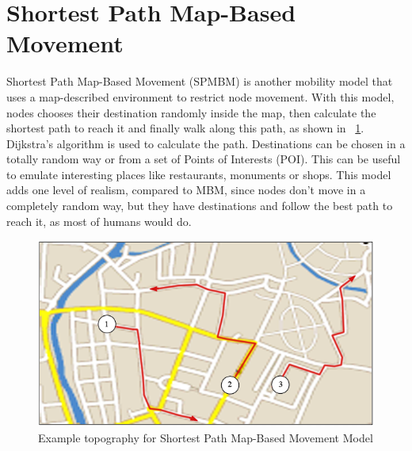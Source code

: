\section{Shortest Path Map-Based Movement}
Shortest Path Map-Based Movement (SPMBM) is another mobility model that uses a map-described environment to restrict node movement. With this model, nodes chooses their destination randomly inside the map, then calculate the shortest path to reach it and finally walk along this path, as shown in \figurename~\ref{fig:waypoint_map}. Dijkstra's algorithm is used to calculate the path. Destinations can be chosen in a totally random way or from a set of Points of Interests (POI). This can be useful to emulate interesting places like restaurants, monuments or shops. This model adds one level of realism, compared to MBM, since nodes don't move in a completely random way, but they have destinations and follow the best path to reach it, as most of humans would do.
\begin{figure}[htpb]
  \begin{center}
    \includegraphics[scale=0.6]{4-movimento/img/waypoint_map.png}
    \caption{Example topography for Shortest Path Map-Based Movement Model}    
    \label{fig:waypoint_map}
  \end{center}
\end{figure}

